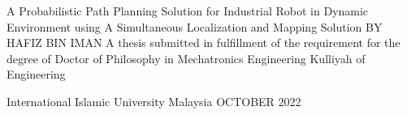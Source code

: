 
\begin{center}
\vspace*{3.5cm}
{\TITLEfontsize A Probabilistic Path Planning Solution for Industrial Robot in Dynamic Environment using A Simultaneous Localization and Mapping Solution
\vfill
BY
\vfill
HAFIZ BIN IMAN
\vfill
A thesis submitted in fulfillment of the requirement for the degree of Doctor
of Philosophy in Mechatronics Engineering
\vfill
Kulliyah of Engineering
\par
International Islamic University Malaysia
\vfill
OCTOBER 2022}

\vspace*{3cm}
\thispagestyle{empty} %
\end{center}


